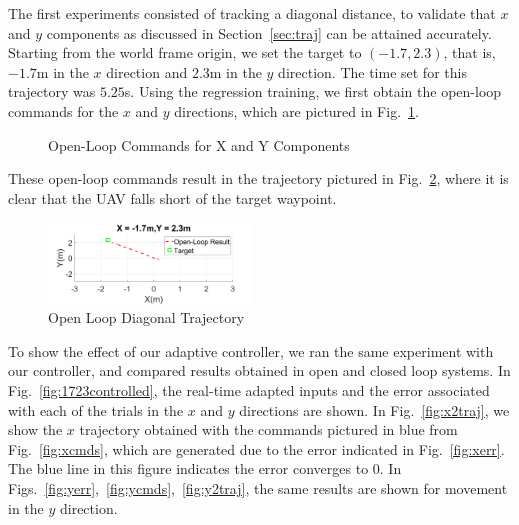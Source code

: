 \documentclass[letterpaper, 10 pt, conference]{ieeeconf}  %
\begin{document}
The first experiments consisted of tracking a diagonal distance, to validate that $x$ and $y$ components as discussed in Section~\ref{sec:traj} can be attained accurately. Starting from the world frame origin, we set the target to $(-1.7,2.3)$, that is, $-1.7$m in the $x$ direction and $2.3$m in the $y$ direction. The time set for this trajectory was $5.25$s. Using the regression training, we first obtain the open-loop commands for the $x$ and $y$ directions, which are pictured in Fig.~\ref{fig:1723cmds}.
\begin{figure}[h]
	\centering
	\caption{Open-Loop Commands for X and Y Components}
	\label{fig:1723cmds}
\end{figure}
These open-loop commands result in the trajectory pictured in Fig.~\ref{fig:1723open}, where it is clear that the UAV falls short of the target waypoint.
\begin{figure}[ht]
    \includegraphics[width=0.48\textwidth]{images/1723open.png}
    \caption{Open Loop Diagonal Trajectory}
    \label{fig:1723open}
\end{figure}

To show the effect of our adaptive controller, we ran the same experiment with our controller, and compared results obtained in open and closed loop systems. In Fig.~\ref{fig:1723controlled}, the real-time adapted inputs and the error associated with each of the trials in the $x$ and $y$ directions are shown. In Fig.~\ref{fig:x2traj}, we show the $x$ trajectory obtained with the commands pictured in blue from Fig.~\ref{fig:xcmds}, which are generated due to the error indicated in Fig.~\ref{fig:xerr}. The blue line in this figure indicates the error converges to $0$. In Figs.~\ref{fig:yerr},~\ref{fig:ycmds},~\ref{fig:y2traj}, the same results are shown for movement in the $y$ direction.
\end{document}
